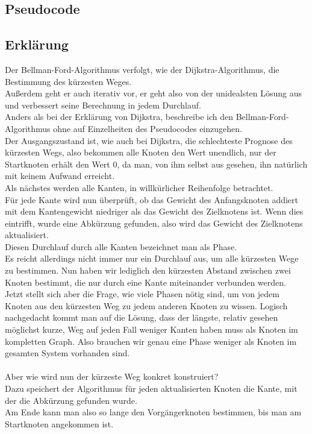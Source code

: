 \documentclass[12pt]{article}
\begin{document}
	\subsection{Pseudocode}
		
		\cite{bellmanfordpseudo}
	
	\subsection{Erklärung}
		Der Bellman-Ford-Algorithmus verfolgt, wie der Dijkstra-Algorithmus, die Bestimmung des kürzesten Weges.\\
		Außerdem geht er auch iterativ vor, er geht also von der unidealsten Lösung aus und verbessert seine Berechnung in jedem Durchlauf.\\
		Anders als bei der Erklärung von Dijkstra, beschreibe ich den Bellman-Ford-Algorithmus ohne auf Einzelheiten des Pseudocodes einzugehen.\\
		Der Ausgangszustand ist, wie auch bei Dijkstra, die schlechteste Prognose des kürzesten Wegs, also bekommen alle Knoten den Wert unendlich, nur der Startknoten erhält den Wert 0, da man, von ihm selbst aus gesehen, ihn natürlich mit keinem Aufwand erreicht.\\
		Als nächstes werden alle Kanten, in willkürlicher Reihenfolge betrachtet.\\
		Für jede Kante wird nun überprüft, ob das Gewicht des Anfangsknoten addiert mit dem Kantengewicht niedriger als das Gewicht des Zielknotens ist. Wenn dies eintrifft, wurde eine Abkürzung gefunden, also wird das Gewicht des Zielknotens aktualisiert.\\
		Diesen Durchlauf durch alle Kanten bezeichnet man als Phase.\\
		Es reicht allerdings nicht immer nur ein Durchlauf aus, um alle kürzesten Wege zu bestimmen. Nun haben wir lediglich den kürzesten Abstand zwischen zwei Knoten bestimmt, die nur durch eine Kante miteinander verbunden werden.\\
		Jetzt stellt sich aber die Frage, wie viele Phasen nötig sind, um von jedem Knoten aus den kürzesten Weg zu jedem anderen Knoten zu wissen. Logisch nachgedacht kommt man auf die Lösung, dass der längste, relativ gesehen möglichst kurze, Weg auf jeden Fall weniger Kanten haben muss als Knoten im kompletten Graph. Also brauchen wir genau eine Phase weniger als Knoten im gesamten System vorhanden sind.\\\\
		Aber wie wird nun der kürzeste Weg konkret konstruiert?\\
		Dazu speichert der Algorithmus für jeden aktualisierten Knoten die Kante, mit der die Abkürzung gefunden wurde.\\
		Am Ende kann man also so lange den Vorgängerknoten bestimmen, bis man am Startknoten angekommen ist. \cite{bellmanford}
	
\end{document}
